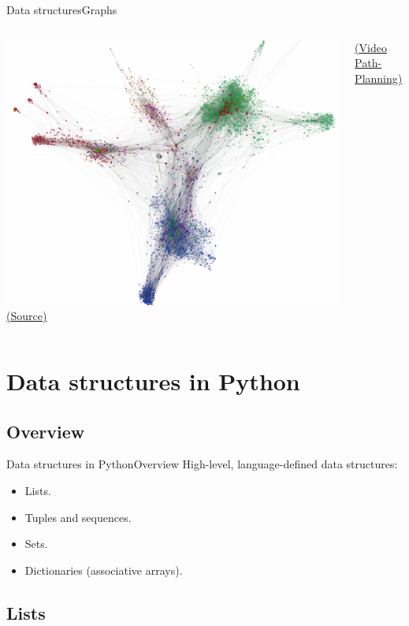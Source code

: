 \documentclass[10pt,compress]{beamer} %
\begin{document}
\begin{frame}{Data structures}{Graphs}
\begin{columns}
		\includegraphics[width=\linewidth]{figs/layout2.png}\\
		\centering \tiny \href{https://gephi.org/features/}{(Source)}


		\normalsize \href{https://www.youtube.com/watch?v=tH9dNESH4ic}{(Video Path-Planning)}

		\end{columns}
\end{frame}

\section{Data structures in Python}
\subsection{Overview}
\begin{frame}{Data structures in Python}{Overview}
	High-level, language-defined data structures:
	\begin{itemize}
		\item Lists.
		\item Tuples and sequences.
		\item Sets.
		\item Dictionaries (associative arrays).
	\end{itemize}
\end{frame}

\subsection{Lists}
\end{document}
